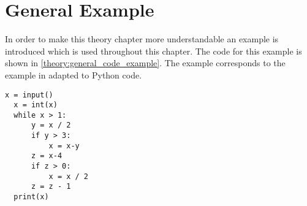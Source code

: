 \section{General Example}
In order to make this theory chapter more understandable an example is introduced which is used throughout this chapter.
The code for this example is shown in \cref{theory:general_code_example}.
The example corresponds to the example in \citet{schwartzbach} adapted to Python code.
\begin{lstlisting}[style=python, caption={The general code example used throughout the theory chapter.}, label={theory:general_code_example}]
  x = input()
  x = int(x)
  while x > 1:
      y = x / 2
      if y > 3:
          x = x-y
      z = x-4
      if z > 0:
          x = x / 2
      z = z - 1
  print(x)
\end{lstlisting}
